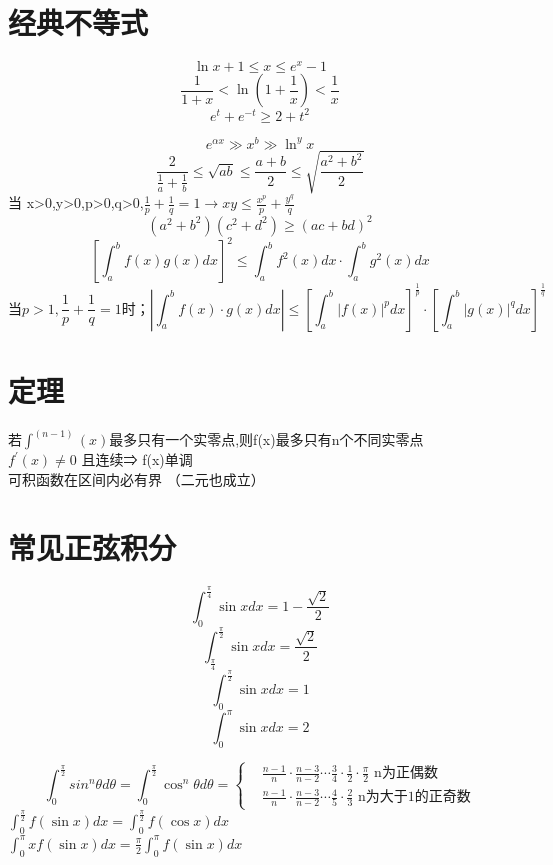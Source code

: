 \documentclass[UTF8]{ctexart}
\begin{document}
\section{经典不等式}
$$\ln x +1 \leq x \leq e^x -1 $$
$$ \frac{1}{1+x} < \ln \left( 1+ \frac{1}{x} \right) < \frac{1}{x}$$
$$ e^t + e^{-t} \geq 2+t^2 $$

$$ e^{αx} \gg x^b \gg \ln^y x $$
$$\frac{2}{\frac{1}{a} + \frac{1}{b}} \leq
\sqrt{ab} \leq \frac{a+b}{2} \leq \sqrt{\frac{a^2+b^2}{2}}$$
当 x>0,y>0,p>0,q>0,$\frac{1}{p}+\frac{1}{q}=1 \rightarrow xy \leq \frac{x^p}{p}+\frac{y^q}{q}$
$$(a^2+b^2)(c^2+d^2) \geq (ac+bd)^2$$
$$ [\int_a^b f(x)g(x)dx]^2 \leq \int_a^b f^2(x)dx\cdot \int_a^b g^2(x)dx$$
$$\mbox{当} p>1, \frac{1}{p}+\frac{1}{q}=1 \mbox{时；} \left| \int_a^b f(x) \cdot g(x)dx\right| \leq \left[ \int_a^b \left| f(x) \right|^p dx \right] ^\frac{1}{p} \cdot \left[ \int_a^b \left| g(x) \right|^q dx \right] ^\frac{1}{q}$$

\section{定理}
​若$\int^{(n-1)}(x)$最多只有一个实零点,则f(x)最多只有n个不同实零点 \\
$f^′(x)≠0$ 且连续⇒ f(x)单调 \\
可积函数在区间内必有界 （二元也成立） \\

\section{常见正弦积分}

$$ \int_0^\frac{\pi}{4} \sin x dx =1- \frac{\sqrt{2}}{2}$$
$$ \int_\frac{\pi}{4}^\frac{\pi}{2} \sin x dx =\frac{\sqrt{2}}{2}$$
$$ \int_0^\frac{\pi}{2} \sin x dx = 1$$
$$ \int_0^\pi \sin x dx =2$$

$$ \int_0^\frac{\pi}{2} sin^n θ d \theta =\int_0^\frac{\pi}{2} \cos^n \theta d \theta =
\begin{cases}
  &\frac{n-1}{n}\cdot\frac{n-3}{n-2} \cdots \frac{3}{4}\cdot\frac{1}{2}\cdot\frac{\pi}{2}\mbox{  n为正偶数} \\
  &\frac{n-1}{n}\cdot\frac{n-3}{n-2}\cdots\frac{4}{5}\cdot\frac{2}{3}\mbox{  n为大于1的正奇数}
\end{cases}
$$
$\int_0^\frac{\pi}{2} f(\sin x) dx = \int_0^\frac{\pi}{2} f(\cos x) dx$ \\
$\int_0^\pi x f(\sin x) dx = \frac{\pi}{2} \int_0^\pi f(\sin x)dx$
\end{document}
